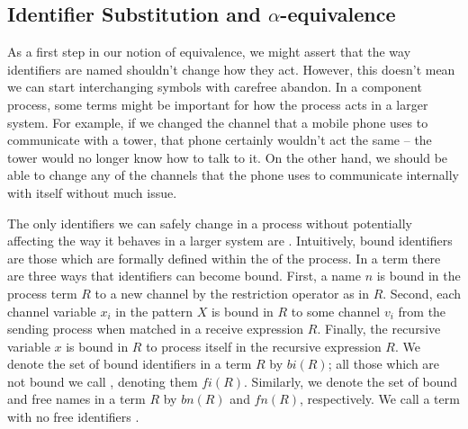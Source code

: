 \subsection{Identifier Substitution and $\alpha$-equivalence}\label{secSubst}
	As a first step in our notion of equivalence, we might assert that the way identifiers are named shouldn't change how they act.  
However, this doesn't mean we can start interchanging symbols with carefree abandon.  
In a component process, some terms might be important for how the process acts in a larger system.  
For example, if we changed the channel that a mobile phone uses to communicate with a tower, that phone certainly wouldn't act the same -- the tower would no longer know how to talk to it.  
On the other hand, we should be able to change any of the channels that the phone uses to communicate internally with itself without much issue.
	
	The only identifiers we can safely change in a process without potentially affecting the way it behaves in a larger system are .  
Intuitively, bound identifiers are those which are formally defined within the of the process.  
In a \picalc term there are three ways that identifiers can become bound.  
First, a name $n$ is bound in the process term $R$ to a new channel by the restriction operator as in $R$.  
Second, each channel variable $x_i$ in the pattern $X$ is bound in $R$ to some channel $v_i$ from the sending process when matched in a receive expression $R$.  
Finally, the recursive variable $x$ is bound in $R$ to process itself in the recursive expression $R$.
	We denote the set of bound identifiers in a term $R$ by $bi(R)$; all those which are not bound we call , denoting them $fi(R)$.  
Similarly, we denote the set of bound and free names in a term $R$ by $bn(R)$ and $fn(R)$, respectively.  
We call a term with no free identifiers .
	
